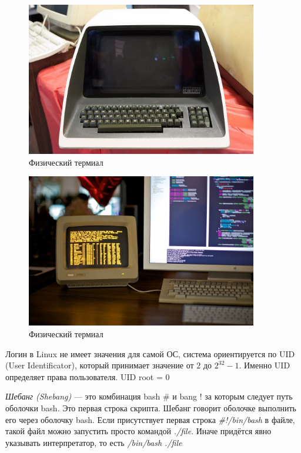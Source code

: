\documentclass[oneside, final, 14pt]{extreport} %
\begin{document}
\begin{figure}[ht]
    \centering
    \includegraphics[width=0.9\textwidth]{5.png}
    \caption{Физический термиал}
    \label{fig:5}
\end{figure}

\begin{figure}[ht]
    \centering
    \includegraphics[width=0.9\textwidth]{6.png}
    \caption{Физический термиал}
    \label{fig:6}
\end{figure}

Логин в Linux не имеет значения для самой ОС, система ориентируется по UID (User Identificator), 
который принимает значение от $2$ до  $2^{32} - 1 $. Именно UID определяет права пользователя.
UID root = 0

\textit{Шебанг (Shebang) } --- это комбинация bash \# и bang ! за которым следует путь оболочки bash. 
Это первая строка скрипта. Шебанг говорит оболочке выполнить его через оболочку bash.
Если присутствует первая строка \textit{\#!/bin/bash} в файле, такой файл можно запустить 
просто командой \textit{./file}. Иначе придётся явно указывать интерпретатор, то есть
\textit{/bin/bash ./file}
\end{document}
